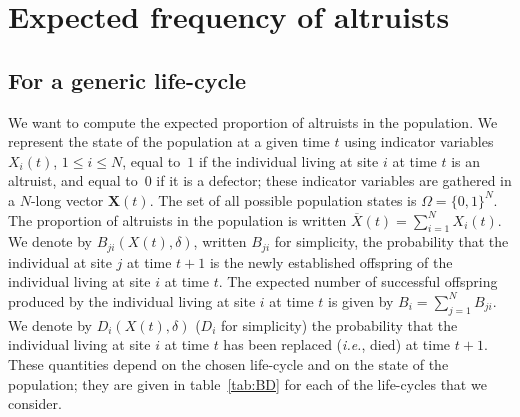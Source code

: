 \documentclass[11pt, letterpaper]{article}
\newcommand{\ie}{\textit{i.e.}}
\newcommand{\appname}[0]{Appendix}
\newcommand{\selstr}{\delta}
\begin{document}
\clearpage
\section{Expected frequency of altruists\label{sec:app:EX}}



\subsection{For a generic life-cycle \label{sec:app:generic}}

We want to compute the expected proportion of altruists in the population. We represent the state of the population at a given time $t$ using indicator variables $X_i(t)$, $1\leq i \leq N$, equal to~$1$ if the individual living at site $i$ at time $t$ is an altruist, and equal to~$0$ if it is a defector; these indicator variables are gathered in a $N$-long vector $\mathbf{X}(t)$. The set of all possible population states is $\Omega = \{0,1\}^N$. The proportion of altruists in the population is written $\overline{X}(t) = \sum_{i=1}^N X_i(t)$. We denote by $B_{ji}(X(t), \selstr)$, written $B_{ji}$ for simplicity, the probability that the individual at site $j$ at time $t+1$ is the newly established offspring of the individual living at site $i$ at time $t$. The expected number of successful offspring produced by the individual living at site $i$ at time $t$ is given by $B_i = \sum_{j=1}^N B_{ji}$. We denote by $D_{i}(X(t), \selstr)$ ($D_i$ for simplicity) the probability that the individual living at site $i$ at time $t$ has been replaced (\ie, died) at time $t+1$. These quantities depend on the chosen life-cycle and on the state of the population; they are given in table~\ref{tab:BD} for each of the life-cycles that we consider. 
\end{document}
